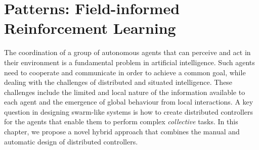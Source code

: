 %

%
\chapter[Patterns: Field-informed Reinforcement Learning]{Patterns: Field-informed Reinforcement Learning}\label{chap:rl:field-informed}%
\minitoc%

\newcommand{\ga}[1]{\meta{red}{GA}{#1}}
\newcommand{\lukas}[1]{\meta{purple}{Lukas}{#1}}
\newcommand{\mv}[1]{\meta{green}{MV}{#1}}
\newcommand{\review}[1]{{#1}}
The coordination of a group of autonomous agents that can perceive and act in their environment is a fundamental problem in artificial intelligence. 
Such agents need to cooperate and communicate in order to achieve a common goal, 
 while dealing with the challenges of distributed and situated intelligence. 
 These challenges include the limited and local nature of the information available to each agent and the emergence of global behaviour from local interactions. 
%
A key question in designing swarm-like systems is how to create distributed controllers for the agents that enable them to perform complex \emph{collective} tasks. 
%
In this chapter, we propose a novel hybrid approach that combines the manual and automatic design of distributed controllers.


